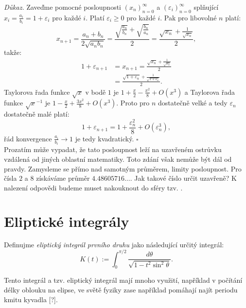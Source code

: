 \documentclass[12pt]{report}
\begin{document}
\noindent \textit{Důkaz.} Zaveďme pomocné posloupnosti $(x_n)_{n=0}^{\infty}$ a $(\varepsilon_i)_{n=0}^{\infty}$ splňující $x_i = \frac{a_i}{b_i} = 1 + \varepsilon_i$ pro každé $i$. Platí $\varepsilon_i \geqslant 0$ pro každé $i$. Pak pro libovolné $n$ platí:
\begin{equation*}
x_{n+1} = \frac{a_n+b_n}{2 \sqrt{a_n b_n}} = \frac{\sqrt{\frac{a_n}{b_n}} + \sqrt{\frac{b_n}{a_n}}}{2} = \frac{\sqrt{x_n}+\frac{1}{\sqrt{x_n}}}{2},
\end{equation*}
takže:
\begin{align*}
1+\varepsilon_{n+1} &= x_{n+1} =\frac{\sqrt{x_n}+\frac{1}{\sqrt{x_n}}}{2}\\
&= \frac{\sqrt{1+\varepsilon_n} + \frac{1}{\sqrt{1+\varepsilon_n}}}{2}.
\end{align*}
Taylorova řada funkce $\sqrt{x}$ v bodě $1$ je $1+\frac{x}{2} - \frac{x^2}{8} + O(x^3)$ a Taylorova řada funkce $\sqrt{x}^{-1}$ je $1-\frac{x}{2}+\frac{3 x^2}{8} + O(x^3)$. Proto pro $n$ dostatečně velké a tedy $\varepsilon_n$ dostatečně malé platí:
$$1+\varepsilon_{n+1}  = 1+\frac{\varepsilon_n ^2}{8} + O(\varepsilon_n ^3),$$ 
řád konvergence $\frac{a_i}{b_i} \rightarrow 1$ je tedy kvadratický. \hfill $\square$\\


Prozatím může vypadat, že tato posloupnost leží na uzavřeném ostrůvku vzdálená od jiných oblastní matematiky. Toto zdání však nemůže být dál od pravdy. Zamysleme se přímo nad samotným průměrem, limity posloupnost. Pro čísla $2$ a $8$ získáváme průměr $4.48605716\dots$. Jak takové číslo určit uzavřeně? K nalezení odpovědi budeme muset nakouknout do sféry tzv. .
\section{Eliptické integrály}

\begin{definice}
Definujme \textit{eliptický integrál prvního druhu} jako následující určitý integrál:
\begin{equation*}
K(t) := \int_{0}^{\pi/2} \frac{d \theta}{\sqrt{1 - t^2 \sin^2 \theta}}.
\end{equation*}
\end{definice}

Tento integrál a tzv. eliptický integrál  mají mnoho využití, například v počítání délky oblouku na elipse, ve světě fyziky zase například pomáhají najít periodu kmitu kyvadla [?].
\end{document}
